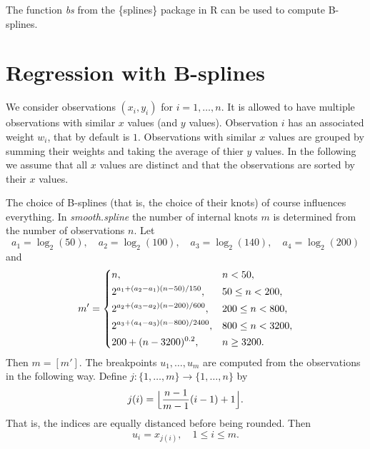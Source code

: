 \documentclass[a4paper]{scrartcl}
\begin{document}
The function \textit{bs} from the \{splines\} package in R can be used to compute B-splines.


\section{Regression with B-splines}
\label{sec:regression}

We consider observations $(x_i, y_i)$ for $i = 1, \ldots, n$. 
It is allowed to have multiple observations with similar $x$ values (and $y$ values).
Observation $i$ has an associated weight $w_i$, that by default is $1$.
Observations with similar $x$ values are grouped by summing their weights and taking the average of thier $y$ values.
In the following we assume that all $x$ values are distinct and that the observations are sorted by their $x$ values.

The choice of B-splines (that is, the choice of their knots) of course influences everything.
In \textit{smooth.spline} the number of internal knots $m$ is determined from the number of observations $n$.
Let
\begin{equation*}
    a_1 = \log_2(50),
    \quad
    a_2 = \log_2(100),
    \quad
    a_3 = \log_2(140),
    \quad
    a_4 = \log_2(200)
\end{equation*}
and
\begin{equation*}
    m' =
    \begin{dcases}
        n, & n < 50,
        \\
        2^{a_1 + (a_2 - a_1) (n - 50) / 150}, & 50 \leq n < 200,
        \\
        2^{a_2 + (a_3 - a_2) (n - 200) / 600}, & 200 \leq n < 800,
        \\
        2^{a_3 + (a_4 - a_3) (n - 800) / 2400}, & 800 \leq n < 3200,
        \\
        200 + (n - 3200)^{0.2}, & n \geq 3200.
    \end{dcases}
\end{equation*}
Then $m = [m']$.
The breakpoints $u_1, \dots, u_m$ are computed from the observations in the following way.
Define $j: \{1, \dots, m\} \rightarrow \{1, \dots, n\}$ by
\begin{equation*}
    j(i) =
    \Bigl\lfloor\frac{n - 1}{m - 1} (i - 1) + 1\Bigr\rfloor.
\end{equation*}
That is, the indices are equally distanced before being rounded.
Then
\begin{equation*}
    u_i = x_{j(i)},
    \quad
    1\leq i\leq m.
\end{equation*}
\end{document}
